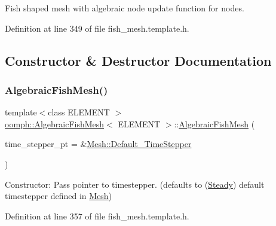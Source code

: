 Fish shaped mesh with algebraic node update function for nodes. 

Definition at line 349 of file fish\+\_\+mesh.\+template.\+h.



\subsection{Constructor \& Destructor Documentation}
\mbox{\label{classoomph_1_1AlgebraicFishMesh_a4382cbf0c75b2b76c9b28e9bae45fd4f}} 
\subsubsection{\texorpdfstring{Algebraic\+Fish\+Mesh()}{AlgebraicFishMesh()}\hspace{0.1cm}{\footnotesize\ttfamily [1/2]}}
{\footnotesize\ttfamily template$<$class E\+L\+E\+M\+E\+NT $>$ \\
\hyperlink{classoomph_1_1AlgebraicFishMesh}{oomph\+::\+Algebraic\+Fish\+Mesh}$<$ E\+L\+E\+M\+E\+NT $>$\+::\hyperlink{classoomph_1_1AlgebraicFishMesh}{Algebraic\+Fish\+Mesh} (\begin{DoxyParamCaption}\item[{\hyperlink{classoomph_1_1TimeStepper}{Time\+Stepper} $\ast$}]{time\+\_\+stepper\+\_\+pt = {\ttfamily \&\hyperlink{classoomph_1_1Mesh_a12243d0fee2b1fcee729ee5a4777ea10}{Mesh\+::\+Default\+\_\+\+Time\+Stepper}} }\end{DoxyParamCaption})\hspace{0.3cm}{\ttfamily [inline]}}



Constructor\+: Pass pointer to timestepper. (defaults to (\hyperlink{classoomph_1_1Steady}{Steady}) default timestepper defined in \hyperlink{classoomph_1_1Mesh}{Mesh}) 



Definition at line 357 of file fish\+\_\+mesh.\+template.\+h.

\mbox{\label{classoomph_1_1AlgebraicFishMesh_aac4b7f18a6e1d10c64edf431af921ce7}} 
